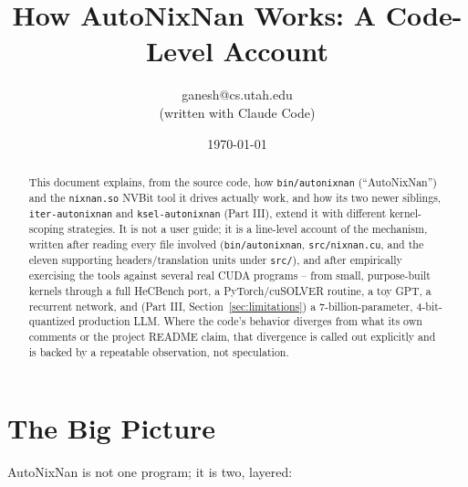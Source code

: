 \documentclass[11pt]{article}
\title{How AutoNixNan Works: A Code-Level Account}
\author{ganesh@cs.utah.edu \\ \small (written with Claude Code)}
\date{\today}
\begin{document}
\maketitle

\begin{abstract}
This document explains, from the source code, how \texttt{bin/autonixnan}
(``AutoNixNan'') and the \texttt{nixnan.so} NVBit tool it drives actually
work, and how its two newer siblings, \texttt{iter-autonixnan} and
\texttt{ksel-autonixnan} (Part III), extend it with different
kernel-scoping strategies. It is not a user guide; it is a line-level
account of the mechanism, written after reading every file involved
(\texttt{bin/autonixnan}, \texttt{src/nixnan.cu}, and the eleven
supporting headers/translation units under \texttt{src/}), and after
empirically exercising the tools against several real CUDA programs --
from small, purpose-built kernels through a full HeCBench port, a
PyTorch/cuSOLVER routine, a toy GPT, a recurrent network, and (Part III,
Section~\ref{sec:limitations}) a 7-billion-parameter, 4-bit-quantized
production LLM. Where the code's behavior diverges from what its own
comments or the project README claim, that divergence is called out
explicitly and is backed by a repeatable observation, not speculation.
\end{abstract}

\tableofcontents

\section{The Big Picture}

AutoNixNan is not one program; it is two, layered:
\end{document}
